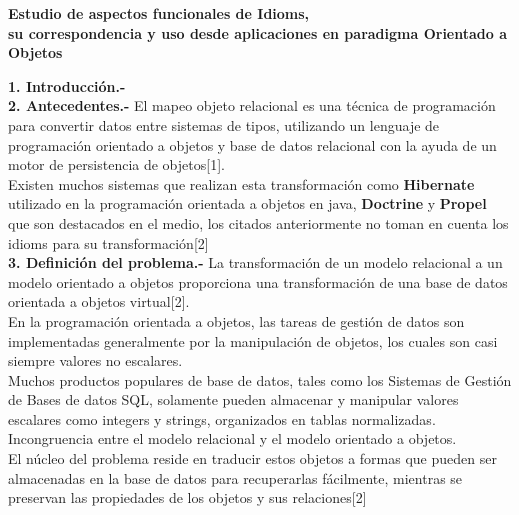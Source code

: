 \documentclass[11pt]{article}
\begin{document}
\begin{center}
\textbf{Estudio de aspectos funcionales de Idioms,}
 \\ \textbf{su correspondencia y uso desde aplicaciones en paradigma Orientado a Objetos}
\end{center}

\begin{flushleft}

\textbf{1. Introducción.-}
\\
\textbf{2. Antecedentes.-}
\textrm{El mapeo objeto relacional es una técnica de programación para convertir datos entre sistemas de tipos, utilizando un lenguaje de programación orientado a objetos y base de datos relacional con la ayuda de un motor de persistencia de objetos{[}1{]}.
\\
\textrm{Existen muchos sistemas que realizan esta transformación como \textbf{Hibernate} utilizado en la programación orientada a objetos en java, \textbf{Doctrine} y \textbf{Propel} que son destacados en el medio, los citados anteriormente no toman en cuenta los idioms para su transformación{[}2{]}} }\\
\textbf{3. Definición del problema.-}
\textrm{La transformación de un modelo relacional a un modelo orientado a objetos proporciona una transformación de una base de datos orientada a objetos virtual{[}2{]}.}
\\
\textrm{En la programación orientada a objetos, las tareas de gestión de datos son implementadas generalmente por la manipulación de objetos, los cuales son casi siempre valores no escalares.}
\\
\textrm{Muchos productos populares de base de datos, tales como los Sistemas de Gestión de Bases de datos SQL, solamente pueden almacenar y manipular valores escalares como integers y strings, organizados en tablas normalizadas.
\\
Incongruencia entre el modelo relacional y el modelo orientado a objetos.
\\
El núcleo del problema reside en traducir estos objetos a formas que pueden ser almacenadas en la base de datos para recuperarlas fácilmente, mientras se preservan las propiedades de los objetos y sus relaciones{[}2{]}
}


\end{flushleft}
\end{document}
